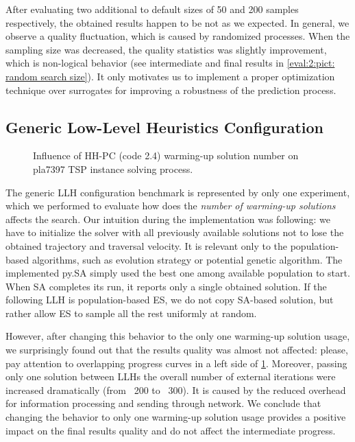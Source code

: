 After evaluating two additional to default sizes of 50 and 200 samples respectively, the obtained results happen to be not as we expected. In general, we observe a quality fluctuation, which is caused by randomized processes. When the sampling size was decreased, the quality statistics was slightly improvement, which is non-logical behavior (see intermediate and final results in \cref{eval:2:pict: random search size}). It only motivates us to implement a proper optimization technique over surrogates for improving a robustness of the prediction process.

\subsection{Generic Low-Level Heuristics Configuration}\label{eval:2:llh changes}
\begin{figure}[h]
	\centering
	\vspace{-10pt}
	
	\caption{Influence of HH-PC (code 2.4) warming-up solution number on pla7397 TSP instance solving process.}
	\vspace{-5pt}
	\label{eval:2:pict:warming-up solutions}
\end{figure}
The generic LLH configuration benchmark is represented by only one experiment, which we performed to evaluate how does the \emph{number of warming-up solutions} affects the search. Our intuition during the implementation was following: we have to initialize the solver with all previously available solutions not to lose the obtained trajectory and traversal velocity. It is relevant only to the population-based algorithms, such as evolution strategy or potential genetic algorithm. The implemented py.SA simply used the best one among available population to start. When SA completes its run, it reports only a single obtained solution. If the following LLH is population-based ES, we do not copy SA-based solution, but rather allow ES to sample all the rest uniformly at random.

However, after changing this behavior to the only one warming-up solution usage, we surprisingly found out that the results quality was almost not affected: please, pay attention to overlapping progress curves in a left side of \cref{eval:2:pict:warming-up solutions}. Moreover, passing only one solution between LLHs the overall number of external iterations were increased dramatically (from ~200 to ~300). It is caused by the reduced overhead for information processing and sending through network. We conclude that changing the behavior to only one warming-up solution usage provides a positive impact on the final results quality and do not affect the intermediate progress.



